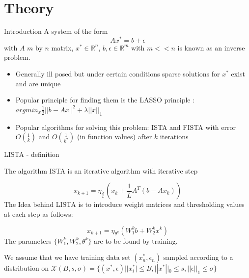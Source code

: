 \documentclass{beamer}
\begin{document}
\section{Theory}
\begin{frame}{Introduction}
    A system of the form 
    \begin{equation*}
        Ax^*=b+\epsilon
    \end{equation*}
with $A$ $m$ by $n$ matrix, $x^*\in\mathbb{R}^n$, $b,\epsilon\in \mathbb{R}^m$ with $m<<n$ is known as an inverse problem. 
\begin{itemize}
    \item Generally ill posed but under certain conditions sparse solutions for $x^*$ exist and are unique
    \item Popular principle for finding them is the LASSO principle : $argmin_{x} \frac{1}{2} ||b-Ax||^2+\lambda||x||_1$
    \item Popular algorithms for solving this problem:
     ISTA and FISTA with error $O(\frac{1}{k})$ and $O(\frac{1}{k^2})$ (in function values) after $k$ iterations
\end{itemize}

\end{frame}
\begin{frame}{LISTA - definition}

The algorithm ISTA is an iterative algorithm with iterative step

\begin{equation*}
    x_{k+1}=\eta_{\frac{\lambda}{L}}(x_{k}+\frac{1}{L}A^T(b-Ax_k))
\end{equation*}
The Idea behind LISTA is to introduce weight matrices and thresholding values at each step as follows:

\begin{equation*}
    x_{k+1}=\eta_{\theta^k}(W_1^kb+W_2^kx^k)
\end{equation*}
The parameters $\{W_1^k,W_2^k,\theta^k\}$ are to be found by training.

We assume that we have training data set $(x^*_n,\epsilon_n)$ sampled according to a distribution on $\mathcal{X}(B,s,\sigma)=\{(x^*,\epsilon)||x^*_i|\leq B, ||x^*||_0\leq s, ||\epsilon||_1\leq \sigma\} $



    
\end{frame}
\end{document}
